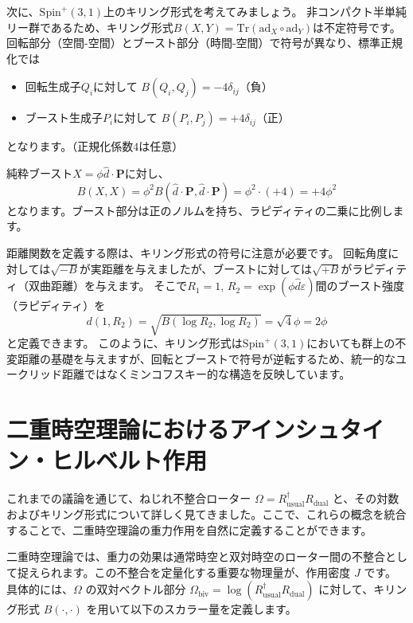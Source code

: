 \documentclass[a4paper,12pt,notitlepage]{jsreport}
\begin{document}
次に、$ \mathrm{Spin}^+(3,1) $上のキリング形式を考えてみましょう。
非コンパクト半単純リー群であるため、キリング形式$B(X,Y) = \mathrm{Tr}(\mathrm{ad}_X \circ \mathrm{ad}_Y)$は不定符号です。
回転部分（空間-空間）とブースト部分（時間-空間）で符号が異なり、標準正規化では
\begin{itemize}
  \item 回転生成子$Q_i$に対して $B(Q_i, Q_j) = -4\delta_{ij}$（負）
  \item ブースト生成子$P_i$に対して $B(P_i, P_j) = +4\delta_{ij}$（正）
\end{itemize}
となります。（正規化係数$4$は任意）

純粋ブースト$X = \phi \hat{d} \cdot \boldsymbol{P}$に対し、
\begin{equation}
  B(X, X) = \phi^2 B(\hat{d} \cdot \boldsymbol{P}, \hat{d} \cdot \boldsymbol{P}) = \phi^2 \cdot (+4) = +4\phi^2
\end{equation}
となります。ブースト部分は正のノルムを持ち、ラピディティの二乗に比例します。

距離関数を定義する際は、キリング形式の符号に注意が必要です。
回転角度に対しては$\sqrt{-B}$が実距離を与えましたが、ブーストに対しては$\sqrt{+B}$がラピディティ（双曲距離）を与えます。
そこで$R_1 = 1$, $R_2 = \exp(\phi \hat{d} \varepsilon)$間のブースト強度（ラピディティ）を
\begin{equation}
  d(1, R_2) = \sqrt{B(\log R_2, \log R_2)} = \sqrt{4} \phi = 2\phi
\end{equation}
と定義できます。
このように、キリング形式は$ \mathrm{Spin}^+(3,1) $においても群上の不変距離の基礎を与えますが、回転とブーストで符号が逆転するため、統一的なユークリッド距離ではなくミンコフスキー的な構造を反映しています。

\section{二重時空理論におけるアインシュタイン・ヒルベルト作用}

これまでの議論を通じて、ねじれ不整合ローター $\Omega = R_\text{usual}^\dagger R_\text{dual}$ と、その対数およびキリング形式について詳しく見てきました。ここで、これらの概念を統合することで、二重時空理論の重力作用を自然に定義することができます。

二重時空理論では、重力の効果は通常時空と双対時空のローター間の不整合として捉えられます。この不整合を定量化する重要な物理量が、作用密度 $J$ です。具体的には、$\Omega$ の双対ベクトル部分 $\Omega_{\text{biv}} = \log(R_\text{usual}^\dagger R_\text{dual})$ に対して、キリング形式 $B(\cdot, \cdot)$ を用いて以下のスカラー量を定義します。
\end{document}
